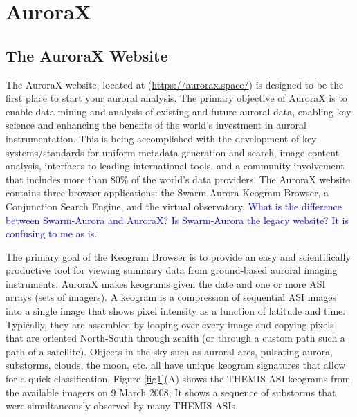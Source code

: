 \documentclass[utf8]{FrontiersinHarvard} %
\begin{document}
\section{AuroraX}\label{aurorax}

\subsection{The AuroraX Website}
The AuroraX website, located at (\url{https://aurorax.space/}) is designed to be the first place to start your auroral analysis. The primary objective of AuroraX is to enable data mining and analysis of existing and future auroral data, enabling key science and enhancing the benefits of the world's investment in auroral instrumentation. This is being accomplished with the development of key systems/standards for uniform metadata generation and search, image content analysis, interfaces to leading international tools, and a community involvement that includes more than 80\% of the world's data providers. The AuroraX website contains three browser applications: the Swarm-Aurora Keogram Browser, a Conjunction Search Engine, and the virtual observatory. \textcolor{blue}{What is the difference between Swarm-Aurora and AuroraX? Is Swarm-Aurora the legacy website? It is confusing to me as is.} 

The primary goal of the Keogram Browser is to provide an easy and scientifically productive tool for viewing summary data from ground-based auroral imaging instruments. AuroraX makes keograms given the date and one or more ASI arrays (sets of imagers). A keogram is a compression of sequential ASI images into a single image that shows pixel intensity as a function of latitude and time. Typically, they are assembled by looping over every image and copying pixels that are oriented North-South through zenith (or through a custom path such a path of a satellite). Objects in the sky such as auroral arcs, pulsating aurora, substorms, clouds, the moon, etc. all have unique keogram signatures that allow for a quick classification. Figure \ref{fig1}(A) shows the THEMIS ASI keograms from the available imagers on 9 March 2008; It shows a sequence of substorms that were simultaneously observed by many THEMIS ASIs. 
\end{document}
